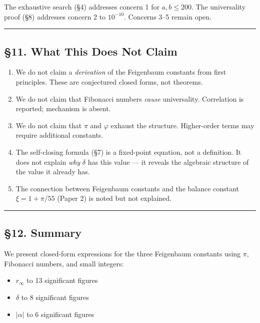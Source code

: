 \documentclass[
  11pt,
  a4paper]{article}
\providecommand{\tightlist}{%
  \setlength{\itemsep}{0pt}\setlength{\parskip}{0pt}}
\begin{document}
The exhaustive search (§4) addresses concern 1 for \(a, b \leq 200\).
The universality proof (§8) addresses concern 2 to \(10^{-10}\).
Concerns 3--5 remain open.

\begin{center}\rule{0.5\linewidth}{0.5pt}\end{center}

\subsection{§11. What This Does Not
Claim}\label{what-this-does-not-claim}

\begin{enumerate}
\def\labelenumi{\arabic{enumi}.}
\tightlist
\item
  We do not claim a \emph{derivation} of the Feigenbaum constants from
  first principles. These are conjectured closed forms, not theorems.
\item
  We do not claim that Fibonacci numbers \emph{cause} universality.
  Correlation is reported; mechanism is absent.
\item
  We do not claim that \(\pi\) and \(\varphi\) exhaust the structure.
  Higher-order terms may require additional constants.
\item
  The self-closing formula (§7) is a fixed-point equation, not a
  definition. It does not explain \emph{why} \(\delta\) has this value
  --- it reveals the algebraic structure of the value it already has.
\item
  The connection between Feigenbaum constants and the balance constant
  \(\xi = 1 + \pi/55\) (Paper 2) is noted but not explained.
\end{enumerate}

\begin{center}\rule{0.5\linewidth}{0.5pt}\end{center}

\subsection{§12. Summary}\label{summary}

We present closed-form expressions for the three Feigenbaum constants
using \(\pi\), Fibonacci numbers, and small integers:

\begin{itemize}
\tightlist
\item
  \(r_\infty\) to 13 significant figures
\item
  \(\delta\) to 8 significant figures
\item
  \(|\alpha|\) to 6 significant figures
\end{itemize}
\end{document}

